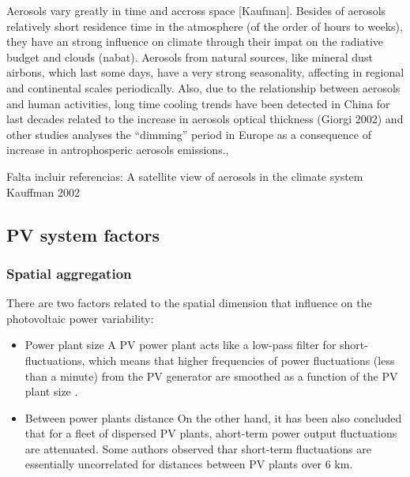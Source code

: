 
Aerosols vary greatly in time and accross space [Kaufman]. Besides of aerosols relatively short residence time in the atmosphere (of the order of hours to weeks), they have an strong influence on climate through their impat on the radiative budget and clouds (nabat). Aerosols from natural sources, like mineral dust airbons, which last some days, have a very strong seasonality, affecting in regional and continental scales periodically.  Also, due to the relationship between aerosols and human activities, long time cooling trends have been detected in China for last decades related to the increase in aerosols optical thickness (Giorgi 2002) and other studies analyses the ``dimming'' period in Europe as a consequence of increase in antrophosperic aerosols emissions., 

{\color{blue} Falta incluir referencias: A satellite view of aerosols in the climate system Kauffman 2002}

\subsection{PV system factors}

\subsubsection{Spatial aggregation}

There are two factors related to the spatial dimension that influence on the photovoltaic power variability:

\begin{itemize}
\item {Power plant size}
  A PV power plant acts like a low-pass filter for short-fluctuations, which means that higher frequencies of power fluctuations (less than a minute) from the PV generator are smoothed as a function of the PV plant size \cite*{Perpinan2011, Perpinan2013}.
\item {Between power plants distance}
  On the other hand, it has been also concluded that for a fleet of dispersed PV plants, ahort-term power output fluctuations are attenuated. Some authors observed thar short-term fluctuations are essentially uncorrelated for distances between PV plants over 6 km.\cite*{Otani1997, Wiemken2001, Hoff2012}
\end{itemize}

